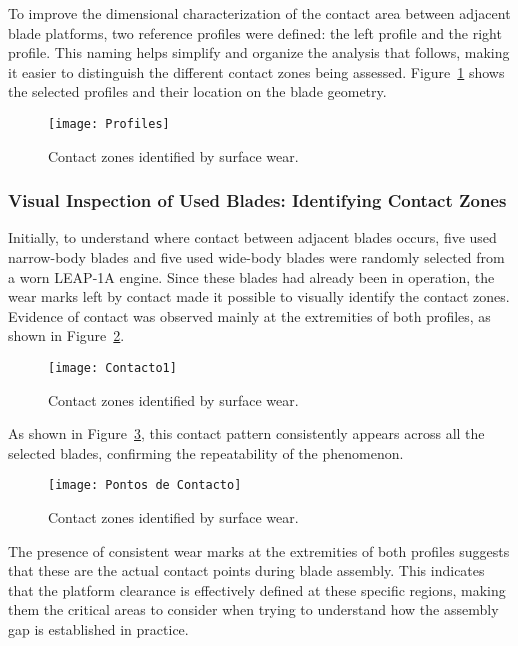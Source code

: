 To improve the dimensional characterization of the contact area between adjacent blade platforms, two reference profiles were defined: the left profile and the right profile. This naming helps simplify and organize the analysis that follows, making it easier to distinguish the different contact zones being assessed. Figure~\ref{fig:profiles} shows the selected profiles and their location on the blade geometry.

\begin{figure}[H]
    \centering
    \texttt{[image: Profiles]}
    \caption{Contact zones identified by surface wear.}
    \label{fig:profiles}
\end{figure}


\subsubsection{Visual Inspection of Used Blades: Identifying Contact Zones}
\label{cha:iv}

Initially, to understand where contact between adjacent blades occurs, five used narrow-body blades and five used wide-body blades were randomly selected from a worn LEAP-1A engine. Since these blades had already been in operation, the wear marks left by contact made it possible to visually identify the contact zones. Evidence of contact was observed mainly at the extremities of both profiles, as shown in Figure~\ref{fig:contacto1}.

\begin{figure}[H]
    \centering
    \texttt{[image: Contacto1]}
    \caption{Contact zones identified by surface wear.}
    \label{fig:contacto1}
\end{figure}

As shown in Figure~\ref{fig:contact}, this contact pattern consistently appears across all the selected blades, confirming the repeatability of the phenomenon. 

\begin{figure}[H]
    \centering
    \texttt{[image: Pontos de Contacto]}
    \caption{Contact zones identified by surface wear.}
    \label{fig:contact}
\end{figure}

The presence of consistent wear marks at the extremities of both profiles suggests that these are the actual contact points during blade assembly. This indicates that the platform clearance is effectively defined at these specific regions, making them the critical areas to consider when trying to understand how the assembly gap is established in practice.

